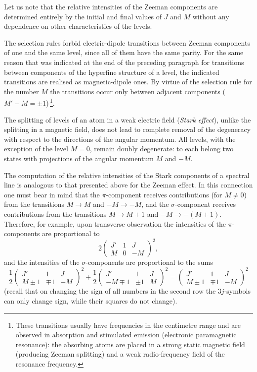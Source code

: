 Let us note that the relative intensities of the Zeeman components are determined entirely by the initial and final values of $J$ and $M$ without any dependence on other characteristics of the levels.

The selection rules forbid electric-dipole transitions between Zeeman components of one and the same level, since all of them have the same parity. For the same reason that was indicated at the end of the preceding paragraph for transitions between components of the hyperfine structure of a level, the indicated transitions are realised as magnetic-dipole ones. By virtue of the selection rule for the number $M$ the transitions occur only between adjacent components ($M' - M = \pm 1$)\,\footnote{These transitions usually have frequencies in the centimetre range and are observed in absorption and stimulated emission (electronic paramagnetic resonance): the absorbing atoms are placed in a strong static magnetic field (producing Zeeman splitting) and a weak radio-frequency field of the resonance frequency.}.

The splitting of levels of an atom in a weak electric field (\textit{Stark effect}), unlike the splitting in a magnetic field, does not lead to complete removal of the degeneracy with respect to the directions of the angular momentum. All levels, with the exception of the level $M = 0$, remain doubly degenerate: to each belong two states with projections of the angular momentum $M$ and $-M$.

The computation of the relative intensities of the Stark components of a spectral line is analogous to that presented above for the Zeeman effect. In this connection one must bear in mind that the $\pi$-component receives contributions (for $M \neq 0$) from the transitions $M \to M$ and $-M \to -M$, and the $\sigma$-component receives contributions from the transitions $M \to M \pm 1$ and $-M \to -(M \pm 1)$. Therefore, for example, upon transverse observation the intensities of the $\pi$-components are proportional to
\[
2\begin{pmatrix} J' & 1 & J \\ M & 0 & -M\end{pmatrix}^{\!2},
\]
and the intensities of the $\sigma$-components are proportional to the sums
\[
\frac{1}{2}\begin{pmatrix} J' & 1 & J \\ M \pm 1 & \mp 1 & -M\end{pmatrix}^{\!2} + \frac{1}{2}\begin{pmatrix} J' & 1 & J \\ -M \mp 1 & \pm 1 & M\end{pmatrix}^{\!2} = \begin{pmatrix} J' & 1 & J \\ M \pm 1 & \mp 1 & -M\end{pmatrix}^{\!2}
\]
(recall that on changing the sign of all numbers in the second row the $3j$-symbols can only change sign, while their squares do not change).

